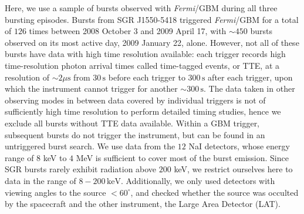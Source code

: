 \documentclass[12pt]{emulateapj}
\newcommand{\project}[1]{\textsl{#1}}
\newcommand{\fermi}{\project{Fermi}}
\begin{document}
Here, we use a sample of bursts observed with \fermi/GBM \citep{meegan2009} during all three bursting episodes. Bursts from SGR J1550-5418 triggered \fermi/GBM for a total of $126$ 
times between 2008 October 3 and 2009 April 17, with $\sim\!\! 450$ bursts observed on its most active day, 2009 January 22, alone. However, not all of these bursts have data with high time resolution
available: each trigger records high time-resolution photon arrival times called time-tagged events, or TTE, at a resolution of $\sim\!\! 2\mu\mathrm{s}$ from $30\,\mathrm{s}$ 
before each trigger to $300\,\mathrm{s}$ after each trigger, upon which the instrument cannot trigger for another $\sim\!\! 300 \,\mathrm{s}$. The data taken in other observing modes in between data covered
by individual triggers is not of sufficiently high time resolution to perform detailed timing studies, hence we exclude all bursts without TTE data available.
Within a GBM trigger, subsequent bursts do not trigger the instrument, but can be found in an untriggered burst search.
We use data from the $12$ NaI detectors, whose energy range of $8$ keV to $4$ MeV is sufficient to cover most of the burst emission. Since SGR bursts rarely exhibit radiation above $200$ keV, we restrict ourselves 
here to data in the range of $8 - 200 \,\mathrm{keV}$. 
Additionally, we only used detectors with viewing angles to the source $< 60^{\circ}$, and checked whether the source was occulted by the spacecraft and the other instrument, the Large Area Detector (LAT). 
\end{document}
